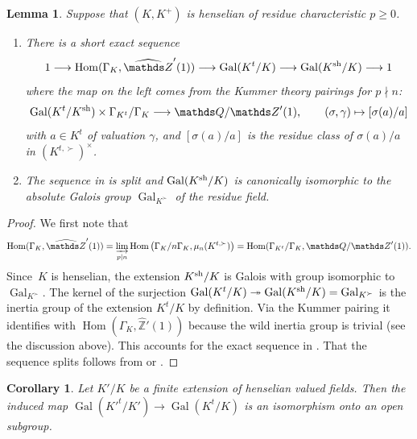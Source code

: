 \documentclass[a4paper,twoside,11pt,reqno]{amsart}
\renewcommand{\mathbb}{\mathds}
\newcommand{\bQ}{{\mathbb Q}}
\newcommand{\bZ}{{\mathbb Z}}
\newcommand{\la}{\longrightarrow}
\DeclareMathOperator{\Hom}{Hom}
\DeclareMathOperator{\Gal}{Gal}
\newcommand{\sh}{{\rm sh}}   %
\newcommand{\hZ}{{\widehat{\bZ}}}
\newtheorem{lem}[thm]{Lemma}
\newtheorem{cor}[thm]{Corollary}
\theoremstyle{definition}
\numberwithin{equation}{subsection}
\begin{document}
\begin{lem} \label{lem:max tame extension}
    Suppose that $(K,K^+)$ is henselian of residue characteristic $p \ge 0$.
    \begin{enumerate}[ref=(\arabic*)]
        \item \label{lemitem:tame galois sequence}
        There is a short exact sequence
        \[
        1 \la \Hom(\Gamma_K,\hZ'(1)) \la \Gal(K^t/K) \la \Gal(K^\sh/K) \la 1
        \]
        where the map on the left comes from the Kummer theory pairings for $p \nmid n$:
        \[
        \Gal(K^t/K^\sh) \times \Gamma_{K^t}/\Gamma_K \la \bQ/\bZ'(1), 
        \qquad (\sigma,\gamma) \mapsto [\sigma(a)/a]
        \]
        with $a \in K^t$ of valuation $\gamma$, and $[\sigma(a)/a]$ is the residue class of $\sigma(a)/a$ in $(K^{t,\succ})^\times$.
  
        \item \label{lemitem:tame galois split}
        The sequence in  is split and 
        $\Gal(K^\sh/K)$ is canonically isomorphic to the absolute Galois group $\Gal_{K^\succ}$ of the residue field.
    \end{enumerate}
\end{lem}
\begin{proof}
    We first note that 
    \[
        \Hom(\Gamma_K,\hZ'(1)) = \varinjlim_{p \mid n} \Hom\big(\Gamma_K/n\Gamma_K,\mu_n(K^{t,\succ})\big) = \Hom(\Gamma_{K^t}/\Gamma_K,\bQ/\bZ'(1)).
    \]
     Since~$K$ is henselian, the extension $K^\sh/K$ is Galois with group isomorphic to $\Gal_{K^\succ}$.
    The kernel of the surjection $\Gal(K^t/K) \twoheadrightarrow \Gal(K^\sh/K) = \Gal_{K^\succ}$ is the inertia group of the extension $K^t/K$ by definition.
    Via the Kummer pairing it identifies with $\Hom(\Gamma_K,\hZ'(1))$ because the wild inertia group is trivial (see the discussion above).
    This accounts for the exact sequence in .
    That the sequence splits follows from  \cite{MelnikovTavgen85} or  \cite[Theorem~2.2]{KuhlmannPankRoquette}.
\end{proof}  

\begin{cor}
\label{cor:pitame injective for fields}
    Let $K'/K$ be a finite extension of henselian valued fields. Then the induced map $\Gal(K'^t/K') \to \Gal(K^t/K)$ is an isomorphism onto an open subgroup.
\end{cor}
\end{document}
